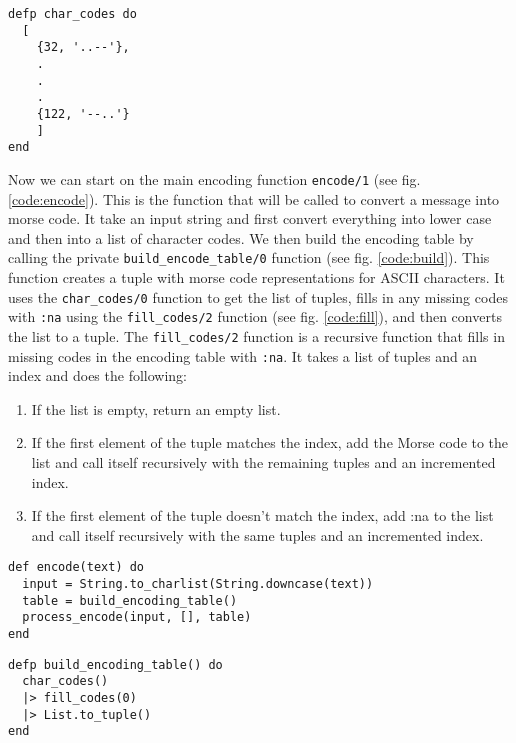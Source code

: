 \documentclass[a4paper,11pt]{article}
\newenvironment{code}{\captionsetup{type=listing}}{}
\begin{document}
\begin{code}
\label{code:morseMap}
\begin{verbatim}
defp char_codes do
  [
    {32, '..--'},
    .
    .
    .
    {122, '--..'}
    ]
end
\end{verbatim}
\end{code}

Now we can start on the main encoding function {\tt encode/1} (see fig. \ref{code:encode}). This is the function that will be called to convert a message into morse code. 
It take an input string and first convert everything into lower case and then into a list of character codes. We then build the encoding table 
by calling the private {\tt build\_encode\_table/0} function (see fig. \ref{code:build}). This function creates a tuple with morse code representations for ASCII characters. 
It uses the {\tt char\_codes/0} function to get the list of tuples, fills in any missing codes with {\tt :na} using the {\tt fill\_codes/2} 
function (see fig. \ref{code:fill}), and then converts the list to a tuple. The {\tt fill\_codes/2} function is a recursive function that fills in missing codes in the 
encoding table with {\tt :na}. It takes a list of tuples and an index and does the following:
\begin{enumerate}
\item If the list is empty, return an empty list.
\item If the first element of the tuple matches the index, add the Morse code to the list and call itself recursively with the remaining tuples 
and an incremented index.
\item If the first element of the tuple doesn't match the index, add :na to the list and call itself recursively with the same tuples and an 
incremented index.
\end{enumerate}


\begin{code}
\label{code:encode}
\begin{verbatim}
def encode(text) do
  input = String.to_charlist(String.downcase(text))
  table = build_encoding_table()
  process_encode(input, [], table)
end
\end{verbatim}
\end{code}

\begin{code}
\label{code:build}
\begin{verbatim}
defp build_encoding_table() do
  char_codes()
  |> fill_codes(0)
  |> List.to_tuple()
end
\end{verbatim}
\end{code}
\end{document}
